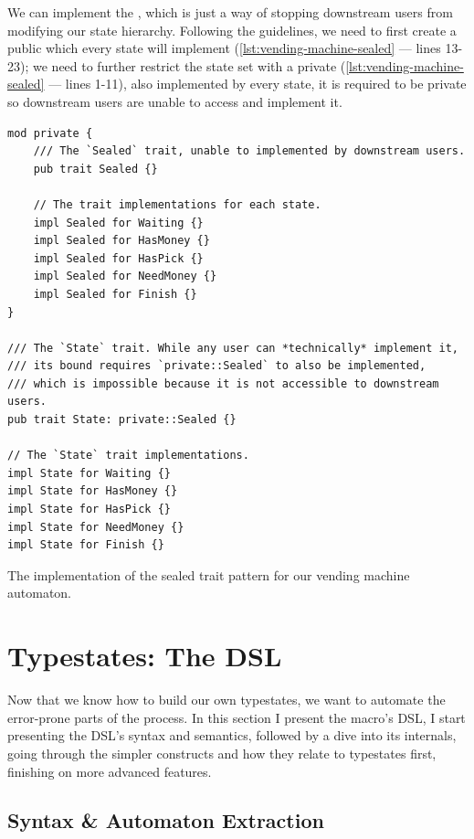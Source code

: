 We can implement the ,
which is just a way of stopping downstream users from modifying our state hierarchy.
Following the guidelines, we need to first create a public  which every state will implement (\autoref{lst:vending-machine-sealed} --- lines 13-23);
we need to further restrict the state set with a private  (\autoref{lst:vending-machine-sealed} --- lines 1-11), also implemented by every state,
it is required to be private so downstream users are unable to access and implement it.

\begin{listing}
    \begin{verbatim}
mod private {
    /// The `Sealed` trait, unable to implemented by downstream users.
    pub trait Sealed {}

    // The trait implementations for each state.
    impl Sealed for Waiting {}
    impl Sealed for HasMoney {}
    impl Sealed for HasPick {}
    impl Sealed for NeedMoney {}
    impl Sealed for Finish {}
}

/// The `State` trait. While any user can *technically* implement it,
/// its bound requires `private::Sealed` to also be implemented,
/// which is impossible because it is not accessible to downstream users.
pub trait State: private::Sealed {}

// The `State` trait implementations.
impl State for Waiting {}
impl State for HasMoney {}
impl State for HasPick {}
impl State for NeedMoney {}
impl State for Finish {}
\end{verbatim}
    \caption{The implementation of the sealed trait pattern for our vending machine automaton.}
    \label{lst:vending-machine-sealed}
\end{listing}


\section{Typestates: The DSL}\label{sec:macro-dsl}

Now that we know how to build our own typestates,
we want to automate the error-prone parts of the process.
In this section I present the macro's DSL,
I start presenting the DSL's syntax and semantics, followed by a dive into its internals,
going through the simpler constructs and how they relate to typestates first,
finishing on more advanced features.


\subsection{Syntax \& Automaton Extraction}\label{sec:macro-dsl:syntax}

